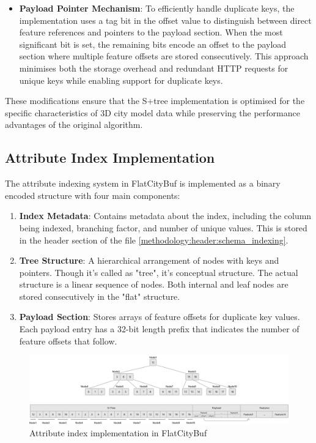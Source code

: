 \begin{itemize}
  \item \textbf{Payload Pointer Mechanism}: To efficiently handle duplicate keys, the implementation uses a tag bit in the offset value to distinguish between direct feature references and pointers to the payload section. When the most significant bit is set, the remaining bits encode an offset to the payload section where multiple feature offsets are stored consecutively. This approach minimises both the storage overhead and redundant HTTP requests for unique keys while enabling support for duplicate keys.

\end{itemize}

These modifications ensure that the S+tree implementation is optimised for the specific characteristics of 3D city model data while preserving the performance advantages of the original algorithm.

\subsection{Attribute Index Implementation}
\label{methodology:attribute_index:implementation}

The attribute indexing system in FlatCityBuf is implemented as a binary encoded structure with four main components:

\begin{enumerate}
  \item \textbf{Index Metadata}: Contains metadata about the index, including the column being indexed, branching factor, and number of unique values. This is stored in the header section of the file \autoref{methodology:header:schema_indexing}.
  \item \textbf{Tree Structure}: A hierarchical arrangement of nodes with keys and pointers. Though it's called as "tree", it's conceptual structure. The actual structure is a linear sequence of nodes. Both internal and leaf nodes are stored consecutively in the "flat" structure.
  \item \textbf{Payload Section}: Stores arrays of feature offsets for duplicate key values. Each payload entry has a 32-bit length prefix that indicates the number of feature offsets that follow.
\end{enumerate}

\begin{figure}[htbp]
  \centering
  \includegraphics[width=1.0\textwidth]{figs/methodology/attribute_index.png}
  \caption{Attribute index implementation in FlatCityBuf}
  \label{fig:methodology:attribute_index}
\end{figure}

